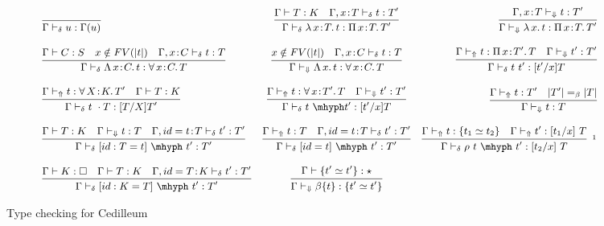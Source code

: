 \documentclass{article}
\newcommand{\ann}[2]{#1\! : \! #2}
\newcommand{\abs}[4]{{#1}\, #2\! : \! #3.\, #4}
\newcommand{\absu}[3]{{#1}\, #2.\, #3}
\newcommand{\decdir}{\vdash_{\delta}}
\newcommand{\decsyn}{\vdash_{\Uparrow}}
\newcommand{\decchk}{\vdash_{\Downarrow}}
\begin{document}
\begin{figure}[h]
  \[ \small
    \begin{array}{lcr}
      \infer
      { \Gamma \decdir u : \Gamma(u)}{}
      & \infer
        { \Gamma \decdir \abs{\lambda}{x}{T}{t} : \abs{\Pi}{x}{T}{T'}}
        { \Gamma \vdash T : K
        \quad \Gamma, \ann{x}{T} \decdir t : T'}
      & \infer
        { \Gamma \decchk \absu{\lambda}{x}{t} : \abs{\Pi}{x}{T}{T'}}
        { \Gamma, \ann{x}{T} \decchk t : T'}
      \\
      \\ \infer
      { \Gamma \decdir \abs{\Lambda}{x}{C}{t} : \abs{\forall}{x}{C}{T}}
      { \Gamma \vdash C : S
      \quad x \notin FV(|t|)
      \quad \Gamma, \ann{x}{C} \decdir t : T
      }
      & \infer
        { \Gamma \decchk \absu{\Lambda}{x}{t} : \abs{\forall}{x}{C}{T}}
        { x \notin FV(|t|)
        \quad \Gamma, \ann{x}{C} \decdir t : T
        }
      & \infer
        { \Gamma \decdir t\ t' : [t'/x]T}
        { \Gamma \decsyn t : \abs{\Pi}{x}{T'}{T}
        \quad \Gamma \decchk t' : T'}
      \\
      \\ \infer
      { \Gamma \decdir t\ \cdot T : [T/X]T'}
      { \Gamma \decsyn t : \abs{\forall}{X}{K}{T'}
      \quad \Gamma \vdash T : K}
      & \infer
        { \Gamma \decdir t\ \mhyph t' : [t'/x]T}
        { \Gamma \decsyn t : \abs{\forall}{x}{T'}{T}
        \quad \Gamma \decchk t' : T'}
      & \infer %
        { \Gamma \decchk t : T }
        { \Gamma \decsyn t : T'
          & |T'| =_{\beta} |T| }
      \\ \\ \infer
      { \Gamma \decdir [ id : T = t ]\ \mhyph\ t' : T'}
      { \Gamma \vdash T : K
        & \Gamma \decchk t : T
        & \Gamma, \ann{id = t}{T} \decdir t' : T'}
      & \infer
        { \Gamma \decdir [ id = t]\ \mhyph\ t' : T' }
        { \Gamma \decsyn t : T
          & \Gamma, \ann{id = t}{T} \decdir t' : T'
        }
      & \infer[\footnotemark] %
        { \Gamma \decdir \rho\ t\ \mhyph\ t' : [t_2/x]\ T}
        { \Gamma \decsyn t : \{ t_1 \simeq t_2 \}
          & \Gamma \decsyn t' : [t_1/x]\ T
        }
      \\ \\ \infer
      { \Gamma \decdir [ id : K = T ]\ \mhyph\ t' : T'}
      { \Gamma \vdash K : \square
        & \Gamma \vdash T : K
        & \Gamma, \ann{id = T}{K} \decdir t' : T'}
      & \infer
        { \Gamma \decchk \beta \{t\} : \{ t' \simeq t' \}}
        { \Gamma \vdash \{ t' \simeq t' \} : \star }
    \end{array}
  \]
  \caption{Type checking for Cedilleum}
\end{figure}
\end{document}
